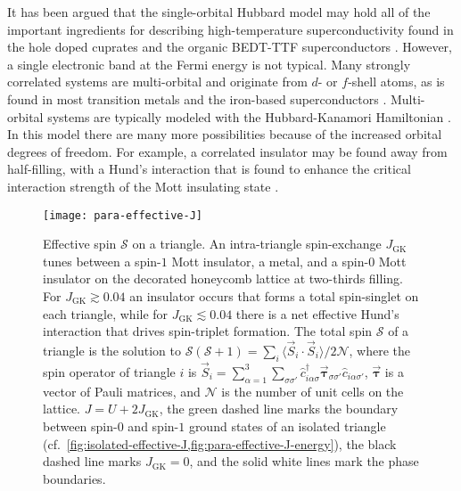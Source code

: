 \documentclass[reprint,aps,prb,amsmath,amssymb]{revtex4-2}
\begin{document}
It has been argued that the single-orbital Hubbard model may hold all of the important ingredients for describing high-temperature superconductivity found in the hole doped cuprates \cite{Zhang1988,Zhang1990} and the organic BEDT-TTF superconductors \cite{Powell2011}. However, a single electronic band at the Fermi energy is not typical. Many strongly correlated systems are multi-orbital and originate from $d$- or $f$-shell atoms, as is found in most transition metals \cite{Tokura2000} and the iron-based superconductors \cite{Si2016}. Multi-orbital systems are typically modeled with the Hubbard-Kanamori Hamiltonian \cite{Kanamori1963,Georges2013}. In this model there are many more possibilities because of the increased orbital degrees of freedom. For example, a correlated insulator may be found away from half-filling, with a Hund's interaction that is found to enhance the critical interaction strength of the Mott insulating state \cite{Georges2013}.

\begin{figure}
	\centering
	\texttt{[image: para-effective-J]}
	\caption{\label{fig:para-effective-J}
		Effective spin $\mathcal{S}$ on a triangle. An intra-triangle spin-exchange $J_{\mathrm{GK}}$ tunes between a spin-$1$ Mott insulator, a metal, and a spin-$0$ Mott insulator on the decorated honeycomb lattice at two-thirds filling.
		For $J_{\mathrm{GK}} \gtrsim 0.04$ an insulator occurs that forms a total spin-singlet on each triangle, while for $J_{\mathrm{GK}} \lesssim 0.04$ there is a net effective Hund's interaction that drives spin-triplet formation.
		The total spin $\mathcal{S}$ of a triangle is the solution to $\mathcal{S}(\mathcal{S} + 1) = \sum_i \langle \vec{S}_i \cdot \vec{S}_i \rangle / 2 \mathcal{N}$, where the spin operator of triangle $i$ is $\vec{S}_i = \sum_{\alpha = 1}^3 \sum_{\sigma \sigma'} \hat{c}_{i\alpha\sigma}^{\dagger} \vec{\bm{\tau}}_{\sigma \sigma'} \hat{c}_{i\alpha\sigma'}$, $\vec{\bm{\tau}}$ is a vector of Pauli matrices, and $\mathcal{N}$ is the number of unit cells on the lattice.
		$J = U + 2J_{\mathrm{GK}}$, the green dashed line marks the boundary between spin-$0$ and spin-$1$ ground states of an isolated triangle (cf.~\cref{fig:isolated-effective-J,fig:para-effective-J-energy}), the black dashed line marks $J_{\mathrm{GK}} = 0$, and the solid white lines mark the phase boundaries.
	}
\end{figure}
\end{document}
